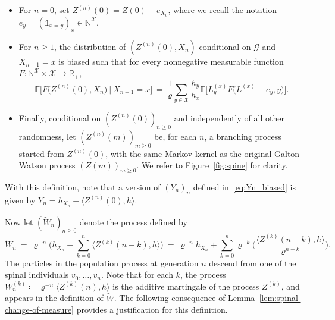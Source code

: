 \begin{refsegment}
\begin{itemize}
  \item For $n=0$, set $Z^{(n)}(0)=Z(0) - e_{X_0}$, where we recall the notation $e_y=(\mathds{1}_{x=y})_{x}\in \mathbb{N}^{\mathcal{X}}$.
  \item For $n\geq 1$, the distribution of $(Z^{(n)}(0), X_n)$ conditional on $\mathcal{G}$ and $X_{n-1}=x$ is biased such that   for every nonnegative measurable function $F:\mathbb{N}^{\mathcal{X}}\times \mathcal{X}\to \mathbb{R}_+$,
  \[
\mathbb{E}\Big[F\big(Z^{(n)}(0), X_n\big)\ \vert\   X_{n-1}=x \Big]\ =\ \frac{1}{\varrho} \sum_{y\in \mathcal{X}}\frac{h_y}{ h_x}\mathbb{E}\Big[L^{(x)}_{y}F\big(L^{(x)}-e_{y}, y\big) \Big].
  \]
  \item Finally, conditional on $(Z^{(n)}(0))_{n\geq 0}$ and independently of all other randomness, let $(Z^{(n)}(m))_{m\geq 0}$ be, for each $n$, a branching process started from $Z^{(n)}(0)$, with the same Markov kernel as the original Galton--Watson process $(Z(m))_{m\geq 0}$. We refer to Figure~\ref{fig:spine} for clarity.
\end{itemize}
With this definition, note that a version of $(Y_n)_n$ defined in~\eqref{eq:Yn_biased} is given by $Y_n=h_{X_n}+\langle Z^{(n)}(0),h\rangle$.

Now let $(\widetilde{W}_n)_{n\geq 0}$ denote the process defined by
\begin{equation}\label{eqdef:tildeW}
  \widetilde{W}_n\ =\ \varrho^{-n}\bigg(h_{X_n} + \sum_{k=0}^{n}\langle Z^{(k)}(n-k), h \rangle\bigg)\ =\ \varrho^{-n}h_{X_n} + \sum_{k=0}^{n}\varrho^{-k}\Big(\frac{\langle Z^{(k)}(n-k), h \rangle}{\varrho^{n-k}}\Big).
\end{equation}
The particles in the population process at generation $n$ descend from one of the spinal individuals $v_0,\ldots, v_{n}$.
Note that for each $k$, the process $W^{(k)}_n \coloneqq \varrho^{-n}\langle Z^{(k)}(n), h \rangle$ is the additive martingale of the process $Z^{(k)}$, and appears in the definition of $\widetilde{W}$. The following consequence of Lemma~\ref{lem:spinal-change-of-measure} provides a justification for this definition.


\end{refsegment}
